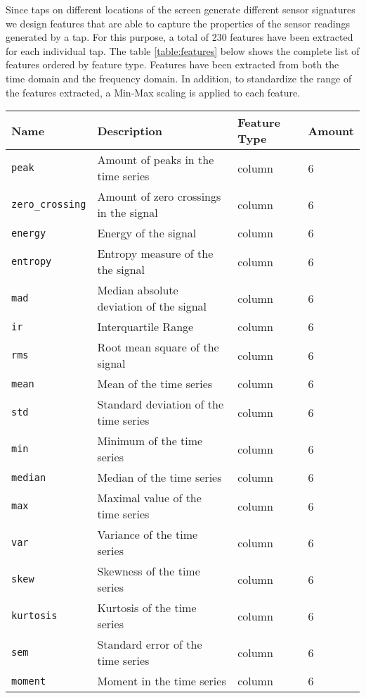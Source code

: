 Since taps on different locations of the screen generate different sensor signatures we design features that are able to capture the properties of the sensor readings generated by a tap. For this purpose, a total of 230 features have been extracted for each individual tap. The table \ref{table:features} below shows the complete list of features ordered by feature type. Features have been extracted from both the time domain and the frequency domain. In addition, to standardize the range of the features extracted, a Min-Max scaling is applied to each feature.

\begin{center}
  \begin{tabular}{ | l| l | l | l |}
  \hline
  Name & Description & Feature Type & Amount \\
  \hline
    \texttt{peak} & Amount of peaks in the time series & column  & 6 \\
    \texttt{zero\_crossing} & Amount of zero crossings in the signal & column  & 6 \\ 
    \texttt{energy} & Energy of the signal & column  & 6 \\ 
    \texttt{entropy} & Entropy measure of the the signal & column  & 6 \\
    \texttt{mad} & Median absolute deviation of the signal & column  & 6 \\
    \texttt{ir} & Interquartile Range & column  & 6 \\
    \texttt{rms} & Root mean square of the signal & column  & 6 \\
    \texttt{mean} & Mean of the time series & column  & 6 \\
    \texttt{std} & Standard deviation of the time series & column  & 6 \\
    \texttt{min} & Minimum of the time series & column  & 6 \\
    \texttt{median} & Median of the time series & column  & 6 \\
    \texttt{max} & Maximal value of the time series & column  & 6 \\
    \texttt{var} & Variance of the time series & column  & 6 \\
    \texttt{skew} & Skewness of the time series & column  & 6 \\
    \texttt{kurtosis} & Kurtosis of the time series & column  & 6 \\
    \texttt{sem} & Standard error of the time series & column  & 6 \\
    \texttt{moment} & Moment in the time series & column & 6 \\

\end{tabular}
\end{center}
